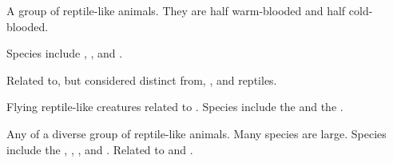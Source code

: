 \begin{gloss}







\begin{comment}
\paragraph{\drake}
\end{comment}
\gitem{\drake}
\index{\drake}
A group of reptile-like animals. 
They are half warm-blooded and half cold-blooded. 

Species include , ,  and . 

Related to, but considered distinct from, ,  and reptiles. 










\begin{comment}
\paragraph{pteran}
\end{comment}
Flying reptile-like creatures related to . 
Species include the \ravcor{} and the \quilrai. 








\begin{comment}
\paragraph{\saurian}
\end{comment}
\gitem{\saurian}
\index{\saurian}
Any of a diverse group of reptile-like animals. 
Many species are large. 
Species include the , , ,  and . 
Related to  and . 
















\end{gloss}










